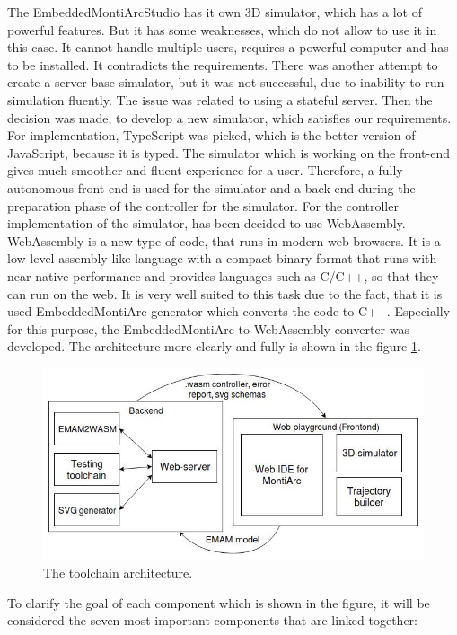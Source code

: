 The EmbeddedMontiArcStudio has it own 3D simulator, which has a lot of powerful features. But it has some weaknesses, which do not allow to use it in this case. It cannot handle multiple users, requires a powerful computer and has to be installed. It contradicts the requirements. There was another attempt to create a server-base simulator, but it was not successful, due to inability to run simulation fluently. The issue was related to using a stateful server. Then the decision was made, to develop a new simulator, which satisfies our requirements. For implementation, TypeScript was picked, which is the better version of JavaScript, because it is typed. The simulator which is working on the front-end gives much smoother and fluent experience for a user. Therefore, a fully autonomous front-end is used for the simulator and a back-end during the preparation phase of the controller for the simulator. For the controller implementation of the simulator, has been decided to use WebAssembly. WebAssembly is a new type of code, that runs in modern web browsers. It is a low-level assembly-like language with a compact binary format that runs with near-native performance and provides languages such as C/C++, so that they can run on the web. It is very well suited to this task due to the fact, that it is used EmbeddedMontiArc generator which converts the code to C++. Especially for this purpose, the EmbeddedMontiArc to WebAssembly converter was developed. The architecture more clearly and fully is shown in the figure \ref{fig:architecture}.
\begin{figure}[h!]
    \centering
    \includegraphics[width=\linewidth]{src/pic/architecture}
    \caption{The toolchain architecture.}
    \label{fig:architecture}
\end{figure} \newline
To clarify the goal of each component which is shown in the figure, it will be considered the seven most important components that are linked together:
